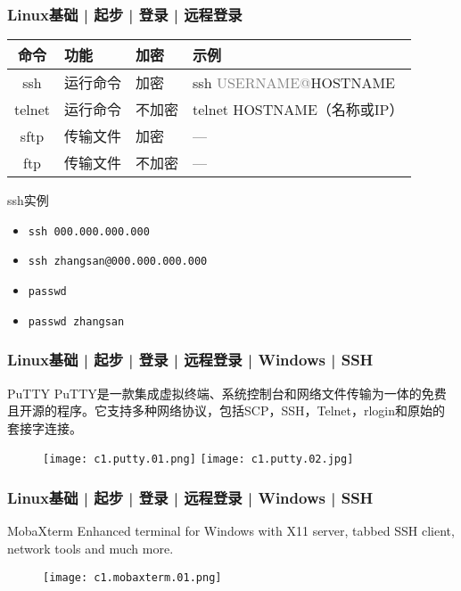 \begin{frame}[fragile]
  \frametitle{Linux基础 | 起步 | 登录 | 远程登录}
  \begin{table}
    \centering
    \begin{tabular}{clll}
      \hline
      \rowcolor{blue!50}命令 & 功能 & 加密 & 示例\\
      \hline
      \alert{ssh} & 运行命令 & 加密 & ssh \textcolor{gray}{USERNAME@}HOSTNAME\\
      telnet & 运行命令 & 不加密 & telnet HOSTNAME（名称或IP）\\
      sftp & 传输文件 & 加密 & ---\\
      ftp & 传输文件 & 不加密 & ---\\
      \hline
    \end{tabular}
  \end{table}
  \pause
  \begin{block}{ssh实例}
    \begin{itemize}
      \item \verb|ssh 000.000.000.000|
      \item \verb|ssh zhangsan@000.000.000.000|
      \item \verb|passwd|
      \item \verb|passwd zhangsan|
    \end{itemize}
  \end{block}
\end{frame}

\begin{frame}
  \frametitle{Linux基础 | 起步 | 登录 | 远程登录 | Windows | SSH}
  \begin{block}{PuTTY}
    PuTTY是一款集成虚拟终端、系统控制台和网络文件传输为一体的免费且开源的程序。它支持多种网络协议，包括SCP，SSH，Telnet，rlogin和原始的套接字连接。\\
  \end{block}
  \begin{figure}
    \centering
    \texttt{[image: c1.putty.01.png]}
    \texttt{[image: c1.putty.02.jpg]}
  \end{figure}
\end{frame}

\begin{frame}
  \frametitle{Linux基础 | 起步 | 登录 | 远程登录 | Windows | SSH}
  \begin{block}{MobaXterm}
    Enhanced terminal for Windows with X11 server, tabbed SSH client, network tools and much more.
  \end{block}
  \begin{figure}
    \centering
    \texttt{[image: c1.mobaxterm.01.png]}
  \end{figure}
\end{frame}

